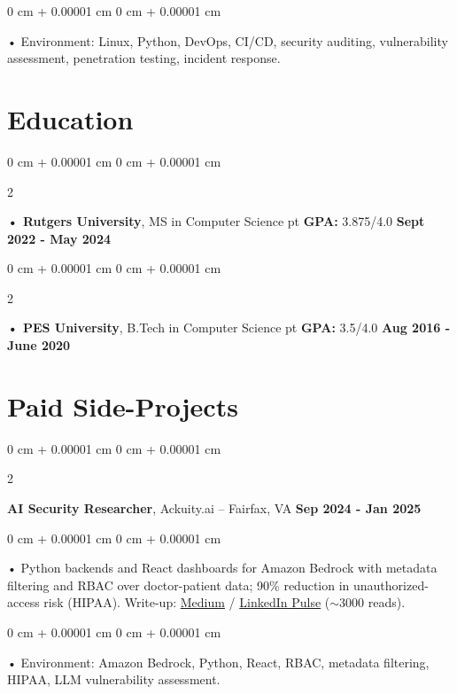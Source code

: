 \documentclass[10pt, letterpaper]{article}
\newenvironment{onecolentry}{
    \begin{adjustwidth}{
        0 cm + 0.00001 cm
    }{
        0 cm + 0.00001 cm
    }
}{
    \end{adjustwidth}
} %
\newenvironment{twocolentry}[2][]{
    \onecolentry
    \def\secondColumn{#2}
    \setcolumnwidth{\fill, 4.5 cm}
    \begin{paracol}{2}
}{
    \switchcolumn \raggedleft \secondColumn
    \end{paracol}
    \endonecolentry
} %
\begin{document}
        \begin{onecolentry}
             • Environment: Linux, Python, DevOps, CI/CD, security auditing, vulnerability assessment, penetration testing, incident response.
        \end{onecolentry}
    \vspace{2 pt }
        \section{Education}
        \vspace{2 pt }
        \begin{twocolentry}{
            \textbf{Sept 2022 - May 2024}
        }
            \textbf{ • Rutgers University}, MS in Computer Science  pt \textbf{GPA:} 3.875/4.0  \end{twocolentry}

        \begin{twocolentry}{
            \textbf{Aug 2016 - June 2020}
        }
            \textbf{ • PES University}, B.Tech in Computer Science  pt \textbf{GPA:} 3.5/4.0  \end{twocolentry}

    \section{Paid Side-Projects}
            \vspace{2 pt }
                    \begin{twocolentry}{
            \textbf{Sep 2024 - Jan 2025}
        }
            \textbf{AI Security Researcher}, Ackuity.ai -- Fairfax, VA\end{twocolentry}

        \begin{onecolentry}
             • Python backends and React dashboards for Amazon Bedrock with metadata filtering and RBAC over doctor-patient data; 90\% reduction in unauthorized-access risk (HIPAA). Write-up: \href{https://medium.com/@sreenikethaathreya/building-a-permission-aware-genai-application-on-amazon-bedrock-8fdc2410dd43}{Medium} / \href{https://www.linkedin.com/pulse/building-permission-aware-genai-application-amazon-bedrock-aathreya-g7nme/}{LinkedIn Pulse} ($\sim$3000 reads).
        \end{onecolentry}
        \begin{onecolentry}
             • Environment: Amazon Bedrock, Python, React, RBAC, metadata filtering, HIPAA, LLM vulnerability assessment.
        \end{onecolentry}
\end{document}
